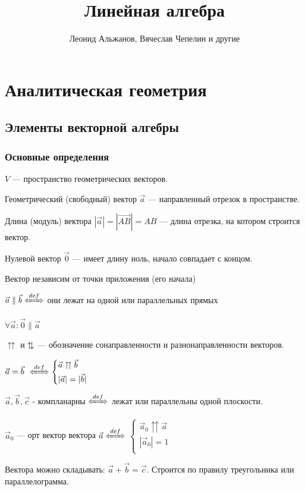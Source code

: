 \documentclass[twoside]{book}
\title{\Huge Линейная алгебра}
\author{Леонид Альжанов, Вячеслав Чепелин и другие}
\date{ }
\newcommand{\updownarrows}{\mathbin\uparrow\hspace{-.5em}\downarrow}
\newcommand{\defLeftrightarrow}{\xLeftrightarrow{def}}
\begin{document}
\maketitle
\tableofcontents

\chapter{Аналитическая геометрия}
\section{Элементы векторной алгебры}
\subsection{Основные определения}
\(V\) --- пространство геометрических векторов.

Геометрический (свободный) вектор \(\vec a\) --- направленный отрезок в пространстве.

Длина (модуль) вектора \(|\vec a| = |\overrightarrow{AB}| = AB\) --- длина отрезка, на котором строится вектор.

Нулевой вектор \(\vec 0\) --- имеет длину ноль, начало совпадает с концом.

Вектор независим от точки приложения (его начала)

\(\vec a \parallel \vec b \defLeftrightarrow\) они лежат на одной или параллельных прямых

\(\forall \vec a:\vec 0 \parallel \vec a\)

\(\upuparrows\) и \(\updownarrows\) --- обозначение сонаправленности и разнонаправленности векторов.

\(
\vec a = \vec b\ \defLeftrightarrow
\begin{cases*}
    \vec a \upuparrows \vec b \\
    |\vec a| = |\vec b|       \\
\end{cases*}
\)

\(\vec a, \vec b, \vec c\) - компланарны \(\defLeftrightarrow\) лежат или параллельны одной плоскости.

\(\vec a_0\) --- орт вектор вектора \(\vec a \defLeftrightarrow\)
\(
\begin{cases*}
    \vec a_0 \upuparrows \vec a \\
    |\vec a_0| = 1              \\
\end{cases*}
\)

Вектора можно складывать: \(\vec a + \vec b = \vec c\). Строится по правилу треугольника или параллелограмма.
\end{document}
